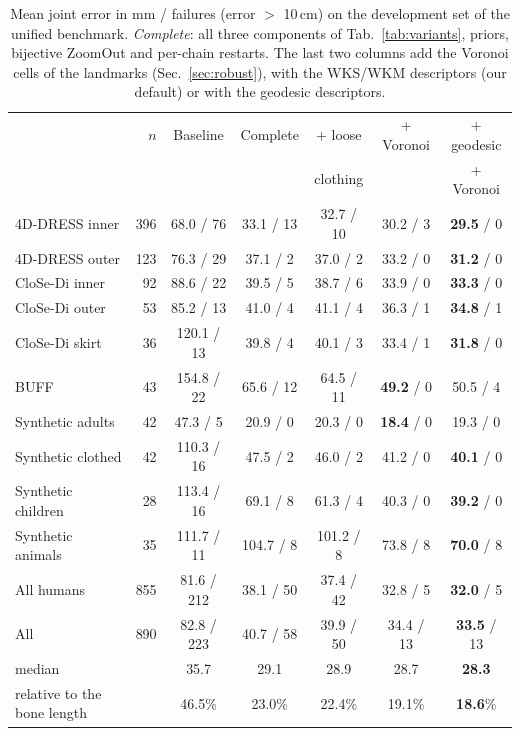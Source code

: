 \documentclass[11pt]{article}
\begin{document}
\begin{table}[t]
  \centering
  \caption{Mean joint error in mm / failures (error $>$ 10\,cm) on the
  development set of the unified benchmark. \emph{Complete}: all three
  components of Tab.~\ref{tab:variants}, priors, bijective ZoomOut and
  per-chain restarts. The last two columns add the Voronoi cells of the
  landmarks (Sec.~\ref{sec:robust}), with the WKS/WKM descriptors (our default)
  or with the geodesic descriptors.}
  \label{tab:unified}
  \small
  \setlength{\tabcolsep}{4pt}
  \begin{tabular}{lrccccc}
    \toprule
    & $n$ & Baseline & Complete & + loose & + Voronoi & + geodesic \\
    &     &          &          & clothing &          & + Voronoi \\
    \midrule
    4D-DRESS inner     & 396 &  68.0 / 76  & 33.1 / 13 & 32.7 / 10 & 30.2 / 3 & \textbf{29.5} / 0 \\
    4D-DRESS outer     & 123 &  76.3 / 29  & 37.1 / 2  & 37.0 / 2  & 33.2 / 0 & \textbf{31.2} / 0 \\
    CloSe-Di inner     &  92 &  88.6 / 22  & 39.5 / 5  & 38.7 / 6  & 33.9 / 0 & \textbf{33.3} / 0 \\
    CloSe-Di outer     &  53 &  85.2 / 13  & 41.0 / 4  & 41.1 / 4  & 36.3 / 1 & \textbf{34.8} / 1 \\
    CloSe-Di skirt     &  36 & 120.1 / 13  & 39.8 / 4  & 40.1 / 3  & 33.4 / 1 & \textbf{31.8} / 0 \\
    BUFF               &  43 & 154.8 / 22  & 65.6 / 12 & 64.5 / 11 & \textbf{49.2} / 0 & 50.5 / 4 \\
    Synthetic adults   &  42 &  47.3 / 5   & 20.9 / 0  & 20.3 / 0  & \textbf{18.4} / 0 & 19.3 / 0 \\
    Synthetic clothed  &  42 & 110.3 / 16  & 47.5 / 2  & 46.0 / 2  & 41.2 / 0 & \textbf{40.1} / 0 \\
    Synthetic children &  28 & 113.4 / 16  & 69.1 / 8  & 61.3 / 4  & 40.3 / 0 & \textbf{39.2} / 0 \\
    Synthetic animals  &  35 & 111.7 / 11  & 104.7 / 8 & 101.2 / 8 & 73.8 / 8 & \textbf{70.0} / 8 \\
    \midrule
    All humans         & 855 &  81.6 / 212 & 38.1 / 50 & 37.4 / 42 & 32.8 / 5 & \textbf{32.0} / 5 \\
    All                & 890 &  82.8 / 223 & 40.7 / 58 & 39.9 / 50 & 34.4 / 13 & \textbf{33.5} / 13 \\
    \quad median       &     &  35.7       & 29.1      & 28.9      & 28.7     & \textbf{28.3} \\
    \quad relative to the bone length & & 46.5\% & 23.0\% & 22.4\% & 19.1\% & \textbf{18.6}\% \\
    \bottomrule
  \end{tabular}
\end{table}
\end{document}
